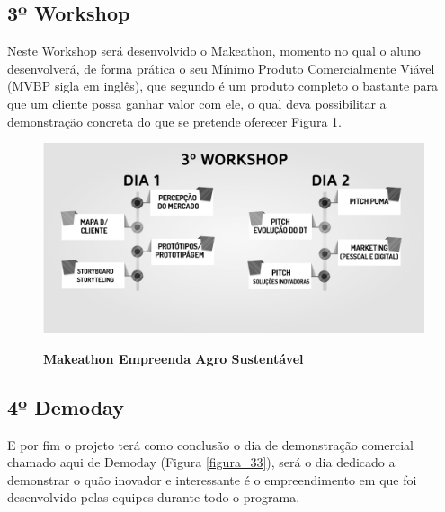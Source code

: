 \subsection{3º Workshop}
 
Neste Workshop será desenvolvido o Makeathon, momento no qual o aluno desenvolverá, de forma prática o seu Mínimo Produto Comercialmente Viável (MVBP sigla em inglês), que segundo  é um produto completo o bastante para que um cliente possa ganhar valor com ele, o qual deva possibilitar a demonstração concreta do que se pretende oferecer Figura \ref{figura_32}. 


\begin{figure}[h!]
\centering
\caption{\textbf{Makeathon Empreenda Agro Sustentável}}
\includegraphics[scale=0.4]{Imagens/3_workshop.png}
\label{figura_32}
\end{figure}



\subsection{4º Demoday}

E por fim o projeto terá como conclusão o dia de demonstração comercial chamado aqui de Demoday (Figura \ref{figura_33}), será o dia dedicado a demonstrar o quão inovador e interessante é o empreendimento em que foi desenvolvido pelas equipes durante todo o programa.


